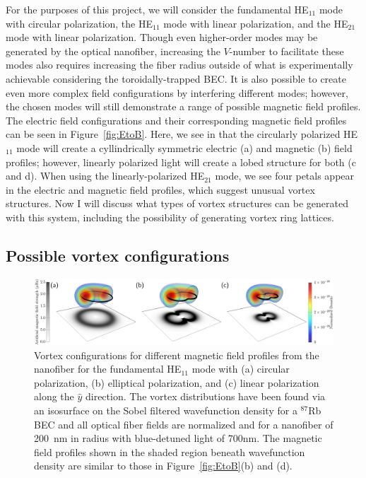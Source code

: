 For the purposes of this project, we will consider the fundamental HE$_{11}$ mode with circular polarization, the HE$_{11}$ mode with linear polarization, and the HE$_{21}$ mode with linear polarization.
Though even higher-order modes may be generated by the optical nanofiber, increasing the $V$-number to facilitate these modes also requires increasing the fiber radius outside of what is experimentally achievable considering the toroidally-trapped BEC.
It is also possible to create even more complex field configurations by interfering different modes; however, the chosen modes will still demonstrate a range of possible magnetic field profiles.
The electric field configurations and their corresponding magnetic field profiles can be seen in Figure~\ref{fig:EtoB}.
Here, we see in that the circularly polarized HE$_{11}$ mode will create a cyllindrically symmetric electric (a) and magnetic (b) field profiles; however, linearly polarized light will create a lobed structure for both (c and d).
When using the linearly-polarized HE$_{21}$ mode, we see four petals appear in the electric and magnetic field profiles, which suggest unusual vortex structures.
Now I will discuss what types of vortex structures can be generated with this system, including the possibility of generating vortex ring lattices.

\subsection{Possible vortex configurations}

\begin{figure}[tb]
\includegraphics[width=\textwidth]{data/3d/vortex_transition.png}
\caption{Vortex configurations for different magnetic field profiles from the nanofiber for the fundamental HE$_{11}$ mode with (a) circular polarization, (b) elliptical polarization, and (c) linear polarization along the $\hat y$ direction.
The vortex distributions have been found via an isosurface on the Sobel filtered wavefunction density for a $^{87}$Rb BEC and all optical fiber fields are normalized and for a nanofiber of 200~nm in radius with blue-detuned light of 700nm.
The magnetic field profiles shown in the shaded region beneath wavefunction density are similar to those in Figure~\ref{fig:EtoB}(b) and (d).}
\label{fig:VortexRings}
\end{figure}

